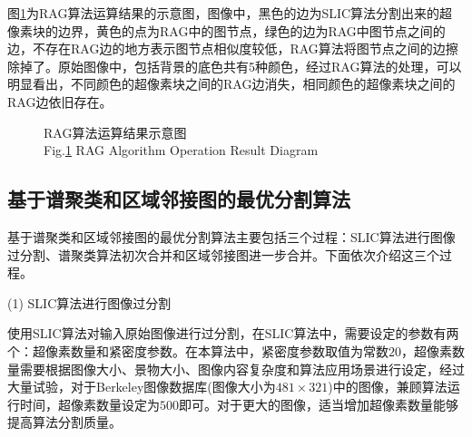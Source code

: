 图\ref{RAG算法运算结果示意图}为RAG算法运算结果的示意图，图像中，黑色的边为SLIC算法分割出来的超像素块的边界，黄色的点为RAG中的图节点，绿色的边为RAG中图节点之间的边，不存在RAG边的地方表示图节点相似度较低，RAG算法将图节点之间的边擦除掉了。原始图像中，包括背景的底色共有5种颜色，经过RAG算法的处理，可以明显看出，不同颜色的超像素块之间的RAG边消失，相同颜色的超像素块之间的RAG边依旧存在。

\begin{figure}[H]
    \centering
    \captionsetup{justification=centering}
    \caption{RAG算法运算结果示意图 \\ Fig.\ref{RAG算法运算结果示意图} RAG Algorithm Operation Result Diagram}
    \label{RAG算法运算结果示意图}
\end{figure}



\subsection{基于谱聚类和区域邻接图的最优分割算法}
基于谱聚类和区域邻接图的最优分割算法主要包括三个过程：SLIC算法进行图像过分割、谱聚类算法初次合并和区域邻接图进一步合并。下面依次介绍这三个过程。

(1) SLIC算法进行图像过分割

使用SLIC算法对输入原始图像进行过分割，在SLIC算法中，需要设定的参数有两个：超像素数量和紧密度参数。在本算法中，紧密度参数取值为常数$20$，超像素数量需要根据图像大小、景物大小、图像内容复杂度和算法应用场景进行设定，经过大量试验，对于Berkeley图像数据库(图像大小为$481\times321$)中的图像，兼顾算法运行时间，超像素数量设定为$500$即可。对于更大的图像，适当增加超像素数量能够提高算法分割质量。

